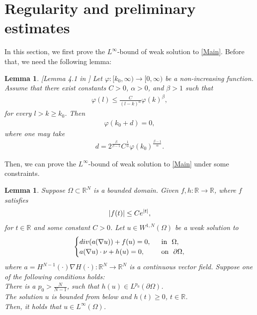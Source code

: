 \documentclass[10pt,a4paper]{amsart}
\numberwithin{equation}{section}
\newtheorem{lemma}[thm]{Lemma}
\newcommand{\R}{\mathbb{R}}
\newcommand{\e}{\textup{e}}
\newcommand{\dt}{\textup{d}t}
\begin{document}
\section{Regularity and preliminary estimates}\label{sec:regularity}
In this section, we first prove the $L^{\infty}$-bound of weak solution to \eqref{Main}. Before that, we need the following lemma:

\begin{lemma}\label{iteration}\textup{[Lemma 4.1 in \cite{S1965}]}
    Let $\varphi:[k_0,\infty)\to[0,\infty)$ be a non-increasing function. Assume that there exist constants $C>0$, $\alpha>0$, and $\beta>1$ such that
    \begin{align*}
        \varphi(l) \leq \frac{C}{(l-k)^{\alpha}} \varphi(k)^{\beta},
    \end{align*}
    for every $l > k \geq k_0$. Then 
    \begin{align*}
        \varphi(k_0 + d) = 0,
    \end{align*}
    where one may take 
    \begin{align*}
        d  = 2^{\frac{\beta}{\beta -1}} C^{\frac{1}{\alpha}} \varphi(k_0)^{\frac{\beta -1}{\alpha}}.
    \end{align*}
\end{lemma}
Then, we can prove the $L^{\infty}$-bound of weak solution to \eqref{Main} under some constraints.

\begin{lemma}
    Suppose $\Omega \subset \R^N $ is a bounded domain. Given $f,h: \R \rightarrow \R$, where $f$ satisfies
    \begin{align*}
        |f(t)| \leq C \e^{|t|},%
    \end{align*}
    for $t \in \R$ and some constant $C>0$. Let $u \in W^{1,N}(\Omega)$ be a weak solution to
    \begin{equation}\label{Main3}
        \begin{cases}
            \textup{div} (a(\nabla u)) + f(u) =0, \ \ &\text{in} \ \ \Omega , \\
            a(\nabla u) \cdot \nu  + h(u)=0, \ \ &\text{on} \ \ \partial \Omega,
        \end{cases}
    \end{equation}
    where $a = H^{N-1}(\cdot)\nabla H(\cdot): \R^N \rightarrow \R^N$ is a continuous vector field. %
    Suppose one of the following conditions holds:\\
     There is a $p_0 > \frac{N}{N-1}$, such that $h(u) \in L^{p_0}(\partial \Omega)$. \\
     The solution $u$ is bounded from below and $h(t) \geq 0$, $t \in \R$.\\
    Then, it holds that $u \in L^{\infty}(\Omega)$.
\end{lemma}
\end{document}
